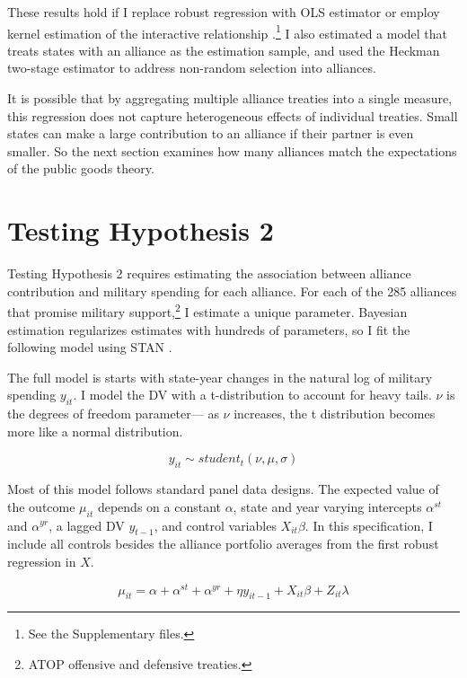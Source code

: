 \documentclass[12pt]{article}
\begin{document}
These results hold if I replace robust regression with OLS estimator or employ kernel estimation of the interactive relationship \citep{Hainmuelleretal2017}.\footnote{See the Supplementary files.} 
I also estimated a model that treats states with an alliance as the estimation sample, and used the Heckman two-stage estimator to address non-random selection into alliances. 


It is possible that by aggregating multiple alliance treaties into a single measure, this regression does not capture heterogeneous effects of individual treaties.
Small states can make a large contribution to an alliance if their partner is even smaller. 
So the next section examines how many alliances match the expectations of the public goods theory. 


\section{Testing Hypothesis 2}


Testing Hypothesis 2 requires estimating the association between alliance contribution and military spending for each alliance.
For each of the 285 alliances that promise military support,\footnote{ATOP offensive and defensive treaties.} I estimate a unique parameter. 
Bayesian estimation regularizes estimates with hundreds of parameters, so I fit the following model using STAN \citep{Carpenteretal2016}.

The full model is starts with state-year changes in the natural log of military spending $y_{it}$.
I model the DV with a t-distribution to account for heavy tails.
$\nu$ is the degrees of freedom parameter--- as $\nu$ increases, the t distribution becomes more like a normal distribution. 


\begin{equation}
y_{it} \sim student_t(\nu, \mu, \sigma) 
\end{equation}


Most of this model follows standard panel data designs.
The expected value of the outcome $\mu_{it}$ depends on a constant $\alpha$, state and year varying intercepts $\alpha^{st}$ and $\alpha^{yr}$, a lagged DV $y_{t-1}$, and control variables $X_{it} \beta$. 
In this specification, I include all controls besides the alliance portfolio averages from the first robust regression in $X$.


\begin{equation}
\mu_{it} = \alpha + \alpha^{st} + \alpha^{yr} + \eta y_{it-1} + X_{it} \beta + Z_{it} \lambda 
\end{equation}
\end{document}
